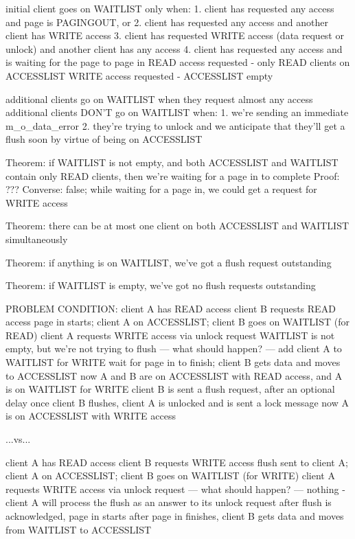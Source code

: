 \documentclass{article}
\begin{document}
initial client goes on WAITLIST only when:
1. client has requested any access and page is PAGINGOUT, or
2. client has requested any access and another client has WRITE access
3. client has requested WRITE access (data request or unlock) and another client has any access
4. client has requested any access and is waiting for the page to page in
     READ access requested - only READ clients on ACCESSLIST
     WRITE access requested - ACCESSLIST empty

additional clients go on WAITLIST when they request almost any access
additional clients DON'T go on WAITLIST when:
1. we're sending an immediate m_o_data_error
2. they're trying to unlock and we anticipate that they'll get a flush soon by virtue of being on ACCESSLIST

Theorem: if WAITLIST is not empty, and both ACCESSLIST and WAITLIST contain only READ clients,
         then we're waiting for a page in to complete
Proof: ???
Converse: false; while waiting for a page in, we could get a request for WRITE access

Theorem: there can be at most one client on both ACCESSLIST and WAITLIST simultaneously

Theorem: if anything is on WAITLIST, we've got a flush request outstanding

Theorem: if WAITLIST is empty, we've got no flush requests outstanding

PROBLEM CONDITION:
client A has READ access
client B requests READ access
page in starts; client A on ACCESSLIST; client B goes on WAITLIST (for READ)
client A requests WRITE access via unlock request
WAITLIST is not empty, but we're not trying to flush
--- what should happen? ---
add client A to WAITLIST for WRITE
wait for page in to finish; client B gets data and moves to ACCESSLIST
now A and B are on ACCESSLIST with READ access, and A is on WAITLIST for WRITE
client B is sent a flush request, after an optional delay
once client B flushes, client A is unlocked and is sent a lock message
now A is on ACCESSLIST with WRITE access

...vs...

client A has READ access
client B requests WRITE access
flush sent to client A; client A on ACCESSLIST; client B goes on WAITLIST (for WRITE)
client A requests WRITE access via unlock request
--- what should happen? ---
nothing - client A will process the flush as an answer to its unlock request
after flush is acknowledged, page in starts
after page in finishes, client B gets data and moves from WAITLIST to ACCESSLIST
\end{document}
